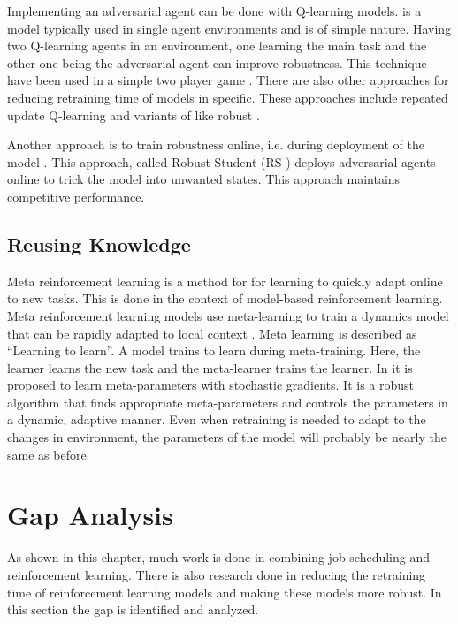Implementing an adversarial agent can be done with Q-learning models.
\Ql is a model typically used in single agent environments and is of simple
nature. Having two Q-learning agents in an environment, one learning the main
task and the other one being the adversarial agent can improve robustness.
This technique have been used in a simple two player game \cite{littman1994}.
There are also other approaches for reducing retraining time of \ql models in
specific. These approaches include repeated update Q-learning
\cite{abdallah2016} and variants of \dqn like robust \dqn \cite{chen2018}.

Another approach is to train robustness online, i.e. during deployment of the
model \cite{fisher2019}. This approach, called Robust Student-\dqn (RS-\dqn)
deploys adversarial agents online to trick the model into unwanted states.
This approach maintains competitive performance.


\subsection{Reusing Knowledge}\label{sec:reusing}

Meta reinforcement learning is a method for for learning to quickly adapt
online to new tasks. This is done in the context of model-based reinforcement
learning. Meta reinforcement learning models use meta-learning to train a
dynamics model that can be rapidly adapted to local context
\cite{nagabandi2019}. Meta learning is described as ``Learning to learn''. A
model trains to learn during meta-training. Here, the learner learns the new
task and the meta-learner trains the learner. In \cite{schweighofer2003} it is
proposed to learn meta-parameters with stochastic gradients. It is a robust
algorithm that finds appropriate meta-parameters and controls the parameters
in a dynamic, adaptive manner. Even when retraining is needed to adapt to the
changes in environment, the parameters of the model will probably be nearly
the same as before.


\section{Gap Analysis}

As shown in this chapter, much work is done in combining job scheduling and
reinforcement learning. There is also research done in reducing the retraining
time of reinforcement learning models and making these models more robust. In
this section the gap is identified and analyzed.

